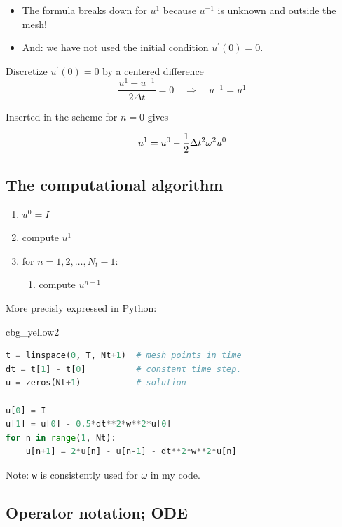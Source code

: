 \documentclass[%
oneside,                 %
final,                   %
10pt]{article}
\newenvironment{_cod_tight}[1]{
   \def\FrameCommand{\colorbox{#1}}
   \FrameRule0.6pt\MakeFramed {\FrameRestore}\vskip3mm}
   {\vskip0mm\endMakeFramed}
\newenvironment{cod}[1]{
\bgroup\rmfamily
\fboxsep=0mm\relax
\begin{_cod_tight}{#1}
\list{}{\parsep=-2mm\parskip=0mm\topsep=0pt\leftmargin=2mm
\rightmargin=2\leftmargin\leftmargin=4pt\relax}
\item\relax}
{\endlist\end{_cod_tight}\egroup}
\begin{document}
\begin{itemize}
  \item The formula breaks down for $u^1$ because $u^{-1}$ is unknown and
    outside the mesh!

  \item And: we have not used the initial condition $u^{\prime}(0)=0$.
\end{itemize}

\noindent
Discretize $u^{\prime}(0)=0$ by a centered difference
\[
\frac{u^1-u^{-1}}{2\Delta t} = 0\quad\Rightarrow\quad u^{-1} = u^1
\]

Inserted in the scheme for $n=0$ gives

\[
u^1 = u^0 - \half \Delta t^2 \omega^2 u^0
\]

\subsection*{The computational algorithm}

\begin{enumerate}
 \item $u^0=I$

 \item compute $u^1$

 \item for $n=1,2,\ldots,N_t-1$:
\begin{enumerate}

   \item compute $u^{n+1}$
\end{enumerate}

\noindent
\end{enumerate}

\noindent
More precisly expressed in Python:

\begin{cod}{cbg_yellow2}\begin{lstlisting}[language=Python,style=simple,xleftmargin=2mm]
t = linspace(0, T, Nt+1)  # mesh points in time
dt = t[1] - t[0]          # constant time step.
u = zeros(Nt+1)           # solution

u[0] = I
u[1] = u[0] - 0.5*dt**2*w**2*u[0]
for n in range(1, Nt):
    u[n+1] = 2*u[n] - u[n-1] - dt**2*w**2*u[n]
\end{lstlisting}\end{cod}
\noindent

Note: \texttt{w} is consistently used for $\omega$ in my code.

\subsection*{Operator notation; ODE}
\end{document}

